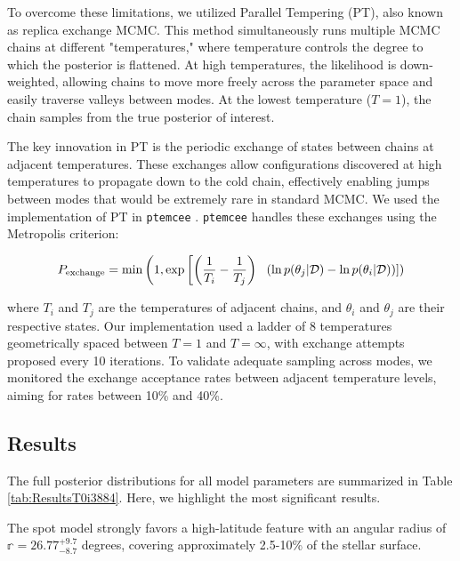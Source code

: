 \documentclass[twocolumn]{aastex631}
\begin{document}
To overcome these limitations, we utilized Parallel Tempering (PT), also known as replica exchange MCMC. 
This method simultaneously runs multiple MCMC chains at different "temperatures," where temperature controls the 
degree to which the posterior is flattened. At high temperatures, the likelihood is down-weighted, allowing chains to 
move more freely across the parameter space and easily traverse valleys between modes. At the lowest temperature 
($T=1$), the chain samples from the true posterior of interest.

The key innovation in PT is the periodic exchange of states between chains at adjacent temperatures. 
These exchanges allow configurations discovered at high temperatures to propagate down to the cold chain, 
effectively enabling jumps between modes that would be extremely rare in standard MCMC. We used the implementation
of PT in \texttt{ptemcee} \citep{ptemcee}. \texttt{ptemcee} handles these exchanges using the Metropolis criterion:

\begin{equation}
    \label{eq:ptemcee}
    P_{\rm exchange} = \min\left(1, \exp\left[\left(\frac{1}{T_i} - \frac{1}{T_j}\right)\right.\right.\\
    \left.\left.\left(\ln p(\theta_j|\mathcal{D}) - \ln p(\theta_i|\mathcal{D})\right)\right]\right)
\end{equation}

where $T_i$ and $T_j$ are the temperatures of adjacent chains, and $\theta_i$ and $\theta_j$ are their respective states.
Our implementation used a ladder of 8 temperatures geometrically spaced between $T=1$ and $T=\infty$, with exchange attempts proposed 
every 10 iterations. To validate adequate sampling across modes, we monitored the exchange acceptance rates between adjacent 
temperature levels, aiming for rates between 10\% and 40\%.

\subsection{Results}
The full posterior distributions for all model parameters are summarized in Table \ref{tab:ResultsT0i3884}. Here, we highlight the 
most significant results.

The spot model strongly favors a high-latitude feature with an angular radius of $\mathbb{r} = 26.77^{+9.7}_{-8.7}$ degrees, 
covering approximately 2.5-10\% of the stellar surface. 
\end{document}
